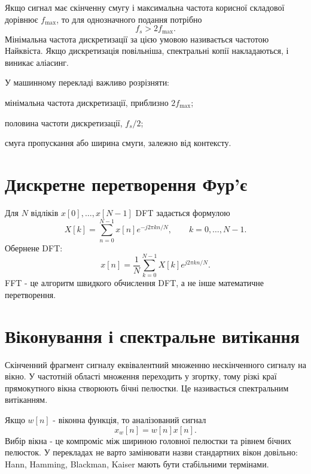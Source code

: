 Якщо сигнал має скінченну смугу і максимальна частота корисної складової дорівнює $f_{\max}$, то для однозначного подання потрібно
\begin{equation}\label{eq:nyquist_session02}
f_s>2f_{\max}.
\end{equation}
Мінімальна частота дискретизації за цією умовою називається частотою Найквіста. Якщо дискретизація повільніша, спектральні копії накладаються, і виникає аліасинг.

У машинному перекладі важливо розрізняти:
\begin{description}[leftmargin=2em]
\item[Nyquist rate] мінімальна частота дискретизації, приблизно $2f_{\max}$;
\item[Nyquist frequency] половина частоти дискретизації, $f_s/2$;
\item[bandwidth] смуга пропускання або ширина смуги, залежно від контексту.
\end{description}

\section{Дискретне перетворення Фур'є}

Для $N$ відліків $x[0],\ldots,x[N-1]$ DFT задається формулою
\begin{equation}\label{eq:dft_session02}
X[k]=\sum_{n=0}^{N-1}x[n]e^{-j2\pi kn/N},\qquad k=0,\ldots,N-1.
\end{equation}
Обернене DFT:
\begin{equation}\label{eq:idft_session02}
x[n]=\frac{1}{N}\sum_{k=0}^{N-1}X[k]e^{j2\pi kn/N}.
\end{equation}
FFT - це алгоритм швидкого обчислення DFT, а не інше математичне перетворення.

\section{Віконування і спектральне витікання}

Скінченний фрагмент сигналу еквівалентний множенню нескінченного сигналу на вікно. У частотній області множення переходить у згортку, тому різкі краї прямокутного вікна створюють бічні пелюстки. Це називається спектральним витіканням.

Якщо $w[n]$ - віконна функція, то аналізований сигнал
\begin{equation}
x_w[n]=w[n]x[n].
\end{equation}
Вибір вікна - це компроміс між шириною головної пелюстки та рівнем бічних пелюсток. У перекладах не варто замінювати назви стандартних вікон довільно: Hann, Hamming, Blackman, Kaiser мають бути стабільними термінами.

